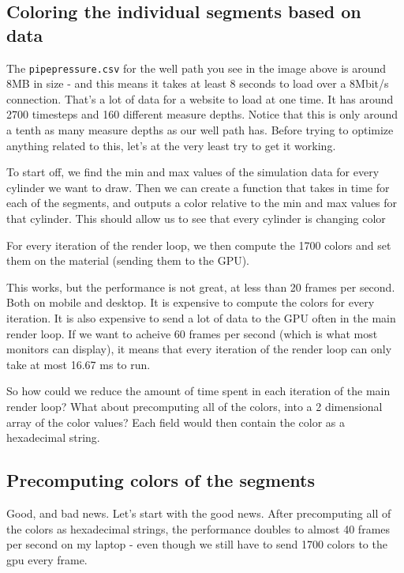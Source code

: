 \hypertarget{coloring-the-individual-segments-based-on-data}{%
\subsection{Coloring the individual segments based on
data}\label{coloring-the-individual-segments-based-on-data}}

The \texttt{pipepressure.csv} for the well path you see in the image
above is around 8MB in size - and this means it takes at least 8 seconds
to load over a 8Mbit/s connection. That's a lot of data for a website to
load at one time. It has around 2700 timesteps and 160 different measure
depths. Notice that this is only around a tenth as many measure depths
as our well path has. Before trying to optimize anything related to
this, let's at the very least try to get it working.

To start off, we find the min and max values of the simulation data for
every cylinder we want to draw. Then we can create a function that takes
in time for each of the segments, and outputs a color relative to the
min and max values for that cylinder. This should allow us to see that
every cylinder is changing color

For every iteration of the render loop, we then compute the 1700 colors
and set them on the material (sending them to the GPU).

This works, but the performance is not great, at less than 20 frames per
second. Both on mobile and desktop. It is expensive to compute the
colors for every iteration. It is also expensive to send a lot of data
to the GPU often in the main render loop. If we want to acheive 60
frames per second (which is what most monitors can display), it means
that every iteration of the render loop can only take at most 16.67 ms
to run.

So how could we reduce the amount of time spent in each iteration of the
main render loop? What about precomputing all of the colors, into a 2
dimensional array of the color values? Each field would then contain the
color as a hexadecimal string.

\hypertarget{precomputing-colors-of-the-segments}{%
\subsection{Precomputing colors of the
segments}\label{precomputing-colors-of-the-segments}}

Good, and bad news. Let's start with the good news. After precomputing
all of the colors as hexadecimal strings, the performance doubles to
almost 40 frames per second on my laptop - even though we still have to
send 1700 colors to the gpu every frame.

